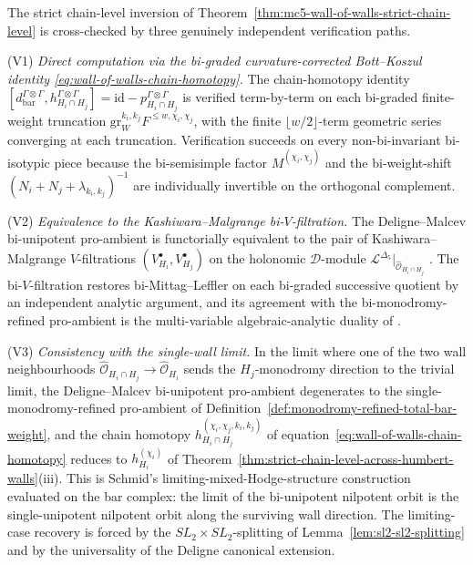 \begin{remark}
\label{rem:three-verification-paths-wall-of-walls}
%
The strict chain-level inversion of
Theorem~\textup{\ref{thm:mc5-wall-of-walls-strict-chain-level}} is
cross-checked by three genuinely independent verification paths.

\textup{(V1)} \emph{Direct computation via the bi-graded
curvature-corrected Bott--Koszul identity
\textup{\eqref{eq:wall-of-walls-chain-homotopy}}.} The chain-homotopy
identity
$[d^{\Gamma\otimes\Gamma}_{\mathrm{bar}},
h^{\Gamma\otimes\Gamma}_{H_i\cap H_j}]
= \mathrm{id} - p^{\Gamma\otimes\Gamma}_{H_i\cap H_j}$
is verified term-by-term on each bi-graded finite-weight truncation
$\mathrm{gr}^{k_i,k_j}_W F^{\leq w,\chi_i,\chi_j}$, with the finite
$\lfloor w/2\rfloor$-term geometric series converging at each
truncation. Verification succeeds on every non-bi-invariant
bi-isotypic piece because the bi-semisimple factor
$M^{(\chi_i,\chi_j)}$ and the bi-weight-shift
$(N_i+N_j+\lambda_{k_i,k_j})^{-1}$ are individually invertible on the
orthogonal complement.

\textup{(V2)} \emph{Equivalence to the Kashiwara--Malgrange
bi-$V$-filtration.} The Deligne--Malcev bi-unipotent pro-ambient is
functorially equivalent to the pair of Kashiwara--Malgrange
$V$-filtrations $(V^\bullet_{H_i}, V^\bullet_{H_j})$ on the holonomic
$\mathcal{D}$-module
$\mathcal{L}^{\Delta_5}|_{\widehat{\mathcal{O}}_{H_i\cap H_j}}$
\cite{Kashiwara1983,Malgrange1983}. The bi-$V$-filtration restores
bi-Mittag--Leffler on each bi-graded successive quotient by an
independent analytic argument, and its agreement with the
bi-monodromy-refined pro-ambient is the multi-variable
algebraic-analytic duality of \cite[Appendix~A]{SaitoMHM1988}.

\textup{(V3)} \emph{Consistency with the single-wall limit.} In the
limit where one of the two wall neighbourhoods
$\widehat{\mathcal{O}}_{H_i\cap H_j}\to \widehat{\mathcal{O}}_{H_i}$
sends the $H_j$-monodromy direction to the trivial limit, the
Deligne--Malcev bi-unipotent pro-ambient degenerates to the
single-monodromy-refined pro-ambient of
Definition~\textup{\ref{def:monodromy-refined-total-bar-weight}}, and
the chain homotopy
$h^{(\chi_i,\chi_j,k_i,k_j)}_{H_i\cap H_j}$ of
equation~\textup{\eqref{eq:wall-of-walls-chain-homotopy}} reduces to
$h^{(\chi_i)}_{H_i}$ of
Theorem~\textup{\ref{thm:strict-chain-level-across-humbert-walls}}(iii).
This is Schmid's limiting-mixed-Hodge-structure construction
\cite[\S 5]{Schmid1973} evaluated on the bar complex: the limit of
the bi-unipotent nilpotent orbit is the single-unipotent nilpotent
orbit along the surviving wall direction. The limiting-case recovery
is forced by the $SL_2\times SL_2$-splitting of
Lemma~\textup{\ref{lem:sl2-sl2-splitting}} and by the universality of
the Deligne canonical extension.


\end{remark}
